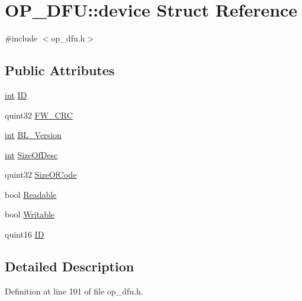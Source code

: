 \hypertarget{struct_o_p___d_f_u_1_1device}{\section{O\-P\-\_\-\-D\-F\-U\-:\-:device Struct Reference}
\label{struct_o_p___d_f_u_1_1device}
}


{\ttfamily \#include $<$op\-\_\-dfu.\-h$>$}

\subsection*{Public Attributes}
\begin{DoxyCompactItemize}
\item 
\hyperlink{ioapi_8h_a787fa3cf048117ba7123753c1e74fcd6}{int} \hyperlink{struct_o_p___d_f_u_1_1device_aa902f110c1dd44ab3decfbafdcfbb3db}{I\-D}
\item 
quint32 \hyperlink{struct_o_p___d_f_u_1_1device_a9f0dfb2fe44c04290c45c907ef33b21d}{F\-W\-\_\-\-C\-R\-C}
\item 
\hyperlink{ioapi_8h_a787fa3cf048117ba7123753c1e74fcd6}{int} \hyperlink{struct_o_p___d_f_u_1_1device_ab89763014053b2de992a088ea6699c7e}{B\-L\-\_\-\-Version}
\item 
\hyperlink{ioapi_8h_a787fa3cf048117ba7123753c1e74fcd6}{int} \hyperlink{struct_o_p___d_f_u_1_1device_af5032c18eb9777d1537ae89d28426567}{Size\-Of\-Desc}
\item 
quint32 \hyperlink{struct_o_p___d_f_u_1_1device_a02ce2352ca3f52e77ef7073f1fd0afeb}{Size\-Of\-Code}
\item 
bool \hyperlink{struct_o_p___d_f_u_1_1device_a0640f3f5608690d8bb93087ba8c15e86}{Readable}
\item 
bool \hyperlink{struct_o_p___d_f_u_1_1device_adf6e576700c6b3bb81fab16a4627d476}{Writable}
\item 
quint16 \hyperlink{struct_o_p___d_f_u_1_1device_afb3f2517289d989e75630f33abbc4685}{I\-D}
\end{DoxyCompactItemize}


\subsection{Detailed Description}


Definition at line 101 of file op\-\_\-dfu.\-h.



